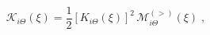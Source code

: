 \begin{equation}
{\mathcal K_{i \Theta}} (\xi)
=
\frac{ 1}{2}
\left[K_{i \Theta} (\xi) \right]^{2}
\,
{\mathcal M}^{(>)}_{i \Theta} ( \xi ) 
\; ,
\label{eq:mathcal_K_integral_Lommel_2nd_useful}
\end{equation}

